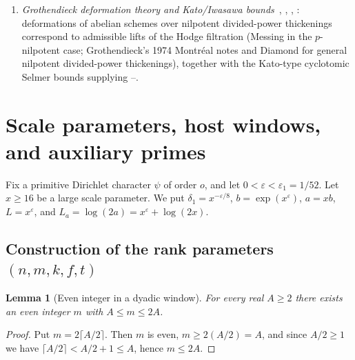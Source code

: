 \documentclass[11pt]{amsart}
\newcommand{\Q}{\mathbb{Q}}
\newcommand{\eps}{\varepsilon}
\theoremstyle{plain}
\newtheorem{lemma}[theorem]{Lemma}
\theoremstyle{definition}
\numberwithin{equation}{section}
\begin{document}
\begin{enumerate}[label=\textup{(C\arabic*)}, leftmargin=3.4em]
  under the Hodge--Tate sign convention in which the cyclotomic character has weight $+1$,
  $\dim_{\Q_p} H^1_f(K_w,V)$ equals the sum over embeddings $\tau$ of the number of negative
  Hodge--Tate weights (equivalently, non-negative dual weights) at $\tau$, with
  Fontaine--Laffaille~\cite[Thm.~4.3, \S8]{fontaine-laffaille} lifting exponents linear in the
  Hodge--Tate height (, ).
\item\label{C7} \emph{Grothendieck deformation theory and Kato/Iwasawa bounds}~\cite[Ch.~V, Thm.~1.6]{messing},
  \cite[Ch.~V, \S4]{grothendieck1974}, \cite[\S2.4]{diamond}, \cite[Thm.~12.5]{kato-euler}:
  deformations of abelian schemes over nilpotent divided-power thickenings correspond to admissible
  lifts of the Hodge filtration (Messing in the $p$-nilpotent case; Grothendieck's 1974 Montr\'eal
  notes and Diamond for general nilpotent divided-power thickenings), together with the Kato-type
  cyclotomic Selmer bounds supplying --.
\end{enumerate}

\section{Scale parameters, host windows, and auxiliary primes}\label{sec:host}

Fix a primitive Dirichlet character $\psi$ of order $o$, and let $0<\eps<\eps_1=1/52$. Let $x\ge16$
be a large scale parameter. We put $\delta_1=x^{-\eps/8}$, $b=\exp(x^\eps)$, $a=xb$, $L=x^\eps$,
and $L_a=\log(2a)=x^\eps+\log(2x)$.

\subsection{Construction of the rank parameters $(n,m,k,f,t)$}

\begin{lemma}[Even integer in a dyadic window]\label{lem:evenbetween}
For every real $A\ge2$ there exists an even integer $m$ with $A\le m\le 2A$.
\end{lemma}

\begin{proof}
Put $m=2\lceil A/2\rceil$. Then $m$ is even, $m\ge 2(A/2)=A$, and since $A/2\ge1$ we have
$\lceil A/2\rceil<A/2+1\le A$, hence $m\le 2A$.
\end{proof}
\end{document}
